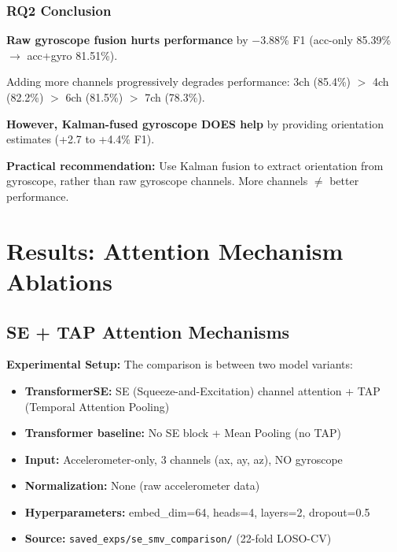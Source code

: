 \documentclass{article}
\begin{document}
\subsubsection{RQ2 Conclusion}

\begin{tcolorbox}[colback=green!5,colframe=green!50!black,title=\textbf{Answer to RQ2: Accelerometer-Only vs Accelerometer+Gyroscope}]
\textbf{Raw gyroscope fusion hurts performance} by $-$3.88\% F1 (acc-only 85.39\% $\rightarrow$ acc+gyro 81.51\%).

Adding more channels progressively degrades performance: 3ch (85.4\%) $>$ 4ch (82.2\%) $>$ 6ch (81.5\%) $>$ 7ch (78.3\%).

\textbf{However, Kalman-fused gyroscope DOES help} by providing orientation estimates (+2.7 to +4.4\% F1).

\textbf{Practical recommendation:} Use Kalman fusion to extract orientation from gyroscope, rather than raw gyroscope channels. More channels $\neq$ better performance.
\end{tcolorbox}

\section{Results: Attention Mechanism Ablations}

\subsection{SE + TAP Attention Mechanisms}

\textbf{Experimental Setup:} The comparison is between two model variants:
\begin{itemize}
    \item \textbf{TransformerSE:} SE (Squeeze-and-Excitation) channel attention + TAP (Temporal Attention Pooling)
    \item \textbf{Transformer baseline:} No SE block + Mean Pooling (no TAP)
    \item \textbf{Input:} Accelerometer-only, 3 channels (ax, ay, az), NO gyroscope
    \item \textbf{Normalization:} None (raw accelerometer data)
    \item \textbf{Hyperparameters:} embed\_dim=64, heads=4, layers=2, dropout=0.5
    \item \textbf{Source:} \texttt{saved\_exps/se\_smv\_comparison/} (22-fold LOSO-CV)
\end{itemize}
\end{document}
